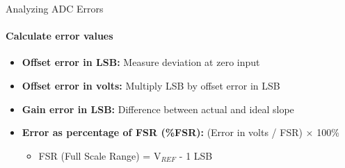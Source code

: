 \begin{KR}{Analyzing ADC Errors}
\paragraph{Calculate error values}
\begin{itemize}
    \item \textbf{Offset error in LSB:} Measure deviation at zero input
    \item \textbf{Offset error in volts:} Multiply LSB by offset error in LSB
    \item \textbf{Gain error in LSB:} Difference between actual and ideal slope
    \item \textbf{Error as percentage of FSR (\%FSR):} (Error in volts / FSR) × 100\%
    \begin{itemize}
        \item FSR (Full Scale Range) = V$_{REF}$ - 1 LSB
    \end{itemize}
\end{itemize}
\end{KR}

